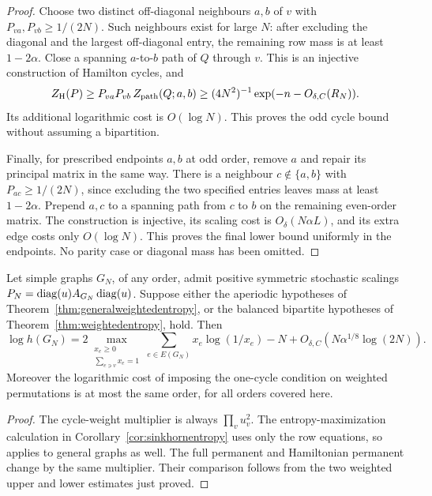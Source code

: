\begin{proof}
Choose two distinct off-diagonal neighbours \(a,b\) of \(v\)
with \(P_{va},P_{vb}\geq1/(2N)\).
Such neighbours exist for large \(N\): after excluding the
diagonal and the largest off-diagonal entry, the remaining
row mass is at least \(1-2\alpha\).
Close a spanning \(a\)-to-\(b\) path of \(Q\) through \(v\).
This is an injective construction of Hamilton cycles, and
\[
 Z_{\rm H}(P)\geq
 P_{va}P_{vb}\,Z_{\rm path}(Q;a,b)
       \geq (4N^2)^{-1}\exp(-n-O_{\delta,C}(R_N)).
\]
Its additional logarithmic cost is \(O(\log N)\).
This proves the odd cycle bound without assuming a bipartition.

Finally, for prescribed endpoints \(a,b\) at odd order, remove
\(a\) and repair its principal matrix in the same way.
There is a neighbour \(c\notin\{a,b\}\) with
\(P_{ac}\geq1/(2N)\), since excluding the two specified entries
leaves mass at least \(1-2\alpha\).
Prepend \(a,c\) to a spanning path from \(c\) to \(b\) on the
remaining even-order matrix.
The construction is injective, its scaling cost is
\(O_\delta(N\alpha L)\), and its extra edge costs only
\(O(\log N)\).
This proves the final lower bound uniformly in the endpoints.
No parity case or diagonal mass has been omitted.
\end{proof}

\begin{corollary}
\label{cor:generalsinkhornentropy}
Let simple graphs \(G_N\), of any order, admit positive
symmetric stochastic scalings
\(P_N=\operatorname{diag}(u)A_{G_N}\operatorname{diag}(u)\).
Suppose either the aperiodic hypotheses of
Theorem~\ref{thm:generalweightedentropy}, or the balanced
bipartite hypotheses of Theorem~\ref{thm:weightedentropy}, hold.
Then
\[
 \log h(G_N)
   =2\max_{\substack{x_e\geq0\\\sum_{e\ni v}x_e=1}}
                \sum_{e\in E(G_N)}x_e\log(1/x_e)
      -N+O_{\delta,C}(N\alpha^{1/8}\log(2N)).
\]
Moreover the logarithmic cost of imposing the one-cycle
condition on weighted permutations is at most the same
order, for all orders covered here.
\end{corollary}
\begin{proof}
The cycle-weight multiplier is always \(\prod_vu_v^2\).
The entropy-maximization calculation in
Corollary~\ref{cor:sinkhornentropy} uses only the row equations,
so applies to general graphs as well.
The full permanent and Hamiltonian permanent change by the
same multiplier. Their comparison follows from the two
weighted upper and lower estimates just proved.
\end{proof}
